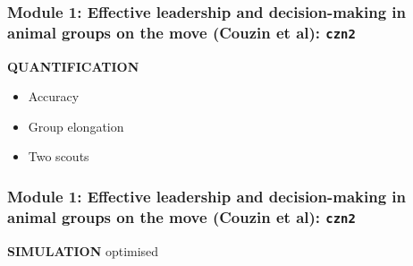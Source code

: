 \documentclass[compress]{beamer}
\begin{document}
\begin{frame}
	\frametitle{Module 1: Effective leadership and decision-making in animal groups on the move (Couzin et al): \texttt{czn2}}
	
	\textbf{QUANTIFICATION} 

	\hspace{1cm}
	
	\begin{itemize}
		\item Accuracy
		\item Group elongation
		\item Two scouts
	\end{itemize}
	
\end{frame}


\begin{frame}
	\frametitle{Module 1: Effective leadership and decision-making in animal groups on the move (Couzin et al): \texttt{czn2}}
	
	\textbf{SIMULATION} optimised
	
\end{frame}


%	
%	



\end{document}
